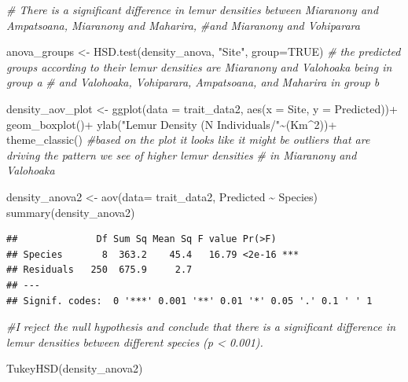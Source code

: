 \documentclass[
  12pt,
]{article}
\newenvironment{Shaded}{\begin{snugshade}}{\end{snugshade}}
\newcommand{\AttributeTok}[1]{\textcolor[rgb]{0.77,0.63,0.00}{#1}}
\newcommand{\CommentTok}[1]{\textcolor[rgb]{0.56,0.35,0.01}{\textit{#1}}}
\newcommand{\ConstantTok}[1]{\textcolor[rgb]{0.00,0.00,0.00}{#1}}
\newcommand{\DecValTok}[1]{\textcolor[rgb]{0.00,0.00,0.81}{#1}}
\newcommand{\FunctionTok}[1]{\textcolor[rgb]{0.00,0.00,0.00}{#1}}
\newcommand{\NormalTok}[1]{#1}
\newcommand{\OtherTok}[1]{\textcolor[rgb]{0.56,0.35,0.01}{#1}}
\newcommand{\SpecialCharTok}[1]{\textcolor[rgb]{0.00,0.00,0.00}{#1}}
\newcommand{\StringTok}[1]{\textcolor[rgb]{0.31,0.60,0.02}{#1}}
\begin{document}
\begin{Shaded}
\begin{Highlighting}[]
\CommentTok{\# There is a significant difference in lemur densities between Miaranony and Ampatsoana, Miaranony and Maharira, }
\CommentTok{\#and Miaranony and Vohiparara }

\NormalTok{anova\_groups }\OtherTok{\textless{}{-}} \FunctionTok{HSD.test}\NormalTok{(density\_anova, }\StringTok{"Site"}\NormalTok{, }\AttributeTok{group=}\ConstantTok{TRUE}\NormalTok{)}
\CommentTok{\# the predicted groups according to their lemur densities are Miaranony and Valohoaka being in group a }
\CommentTok{\# and Valohoaka, Vohiparara, Ampatsoana, and Maharira in group b }


\NormalTok{density\_aov\_plot }\OtherTok{\textless{}{-}} \FunctionTok{ggplot}\NormalTok{(}\AttributeTok{data =}\NormalTok{ trait\_data2, }\FunctionTok{aes}\NormalTok{(}\AttributeTok{x =}\NormalTok{ Site, }\AttributeTok{y =}\NormalTok{ Predicted))}\SpecialCharTok{+}
  \FunctionTok{geom\_boxplot}\NormalTok{()}\SpecialCharTok{+}
  \FunctionTok{ylab}\NormalTok{(}\StringTok{"Lemur Density (N Individuals/"}\SpecialCharTok{\textasciitilde{}}\NormalTok{(Km}\SpecialCharTok{\^{}}\DecValTok{2}\NormalTok{))}\SpecialCharTok{+}
  \FunctionTok{theme\_classic}\NormalTok{()}
\CommentTok{\#based on the plot it looks like it might be outliers that are driving the pattern we see of higher lemur densities}
\CommentTok{\# in Miaranony and Valohoaka}
\end{Highlighting}
\end{Shaded}

\begin{Shaded}
\begin{Highlighting}[]
\NormalTok{density\_anova2 }\OtherTok{\textless{}{-}} \FunctionTok{aov}\NormalTok{(}\AttributeTok{data=}\NormalTok{ trait\_data2, Predicted }\SpecialCharTok{\textasciitilde{}}\NormalTok{ Species)}
\FunctionTok{summary}\NormalTok{(density\_anova2)}
\end{Highlighting}
\end{Shaded}

\begin{verbatim}
##              Df Sum Sq Mean Sq F value Pr(>F)    
## Species       8  363.2    45.4   16.79 <2e-16 ***
## Residuals   250  675.9     2.7                   
## ---
## Signif. codes:  0 '***' 0.001 '**' 0.01 '*' 0.05 '.' 0.1 ' ' 1
\end{verbatim}

\begin{Shaded}
\begin{Highlighting}[]
\CommentTok{\#I reject the null hypothesis and conclude that there is a significant difference in lemur densities between different species (p \textless{} 0.001).}

\FunctionTok{TukeyHSD}\NormalTok{(density\_anova2)}
\end{Highlighting}
\end{Shaded}
\end{document}
